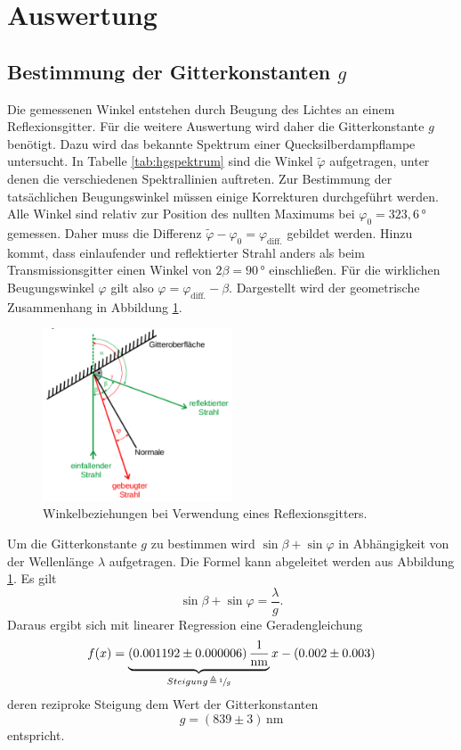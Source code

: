 \section{Auswertung}
\label{sec:Auswertung}

\subsection{Bestimmung der Gitterkonstanten $g$}
Die gemessenen Winkel entstehen durch Beugung des Lichtes an einem Reflexionsgitter. Für die weitere Auswertung wird daher die Gitterkonstante $g$ benötigt. Dazu wird das bekannte Spektrum einer Quecksilberdampflampe untersucht. In Tabelle \ref{tab:hgspektrum} sind die Winkel $\tilde{\varphi}$ aufgetragen, unter denen die verschiedenen Spektrallinien auftreten. Zur Bestimmung der tatsächlichen Beugungswinkel müssen einige Korrekturen durchgeführt werden. Alle Winkel sind relativ zur Position des nullten Maximums bei $\varphi_0=323,6\,\si\degree$ gemessen. Daher muss die Differenz $\tilde{\varphi}-\varphi_0=\varphi_\mathup{diff.}$ gebildet werden. 
 Hinzu kommt, dass einlaufender und reflektierter Strahl anders als beim Transmissionsgitter einen Winkel von $2\beta=90\,\si\degree$ einschließen. Für die wirklichen Beugungswinkel $\varphi$ gilt also $\varphi=\varphi_\mathup{diff.}-\beta$.
Dargestellt wird der geometrische Zusammenhang in Abbildung \ref{fig:winkelbeziehungen}.

\begin{figure}
	\centering
	\includegraphics[width=0.5\textwidth]{Bilder/Winkelbeziehungen.pdf}
	\caption{Winkelbeziehungen bei Verwendung eines Reflexionsgitters.}%
	\label{fig:winkelbeziehungen}
\end{figure}

Um die Gitterkonstante $g$ zu bestimmen wird $\sin{\beta}+\sin{\varphi}$ in Abhängigkeit von der Wellenlänge $\lambda$ aufgetragen. Die Formel kann abgeleitet werden aus Abbildung \ref{fig:winkelbeziehungen}. Es gilt
\begin{equation}
\sin{\beta}+\sin{\varphi}=\frac{\lambda}{g}.
\end{equation}
Daraus ergibt sich mit linearer Regression eine Geradengleichung
\begin{equation}
f(x)= \underbrace{(0.001192 \pm 0.000006)\,\frac{1}{\si{\nano\meter}}}_{Steigung\,\triangleq\,\sfrac{1}{g}}x-(0.002 \pm 0.003)
\label{eq:lin_reg}
\end{equation}
deren reziproke Steigung dem Wert der Gitterkonstanten
\begin{equation}
g=(839 \pm 3)\,\si{\nano\meter}
\label{eq:gitterkonst}
\end{equation}
entspricht.

